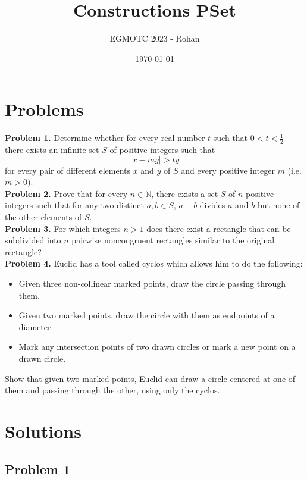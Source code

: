 \documentclass[12pt]{article}
\title{Constructions PSet}
\author{EGMOTC 2023 - Rohan}
\date{\today}
\begin{document}
\maketitle

\newcommand{\localtextbulletone}{\textcolor{black}{\raisebox{.45ex}{\rule{.6ex}{.6ex}}}}
\renewcommand{\labelitemi}{\localtextbulletone}

\section*{Problems}
\vspace{1cm}
\thispagestyle{empty}

\textbf{Problem 1.}
    Determine whether for every real number $t$ such that $0 < t < \tfrac{1}{2} $ there exists an infinite set $S$ of positive integers such that\[|x-my| > ty\]for every pair of different elements $x$ and $y$ of $S$ and every positive integer $m$ (i.e. $m > 0$).\\


\textbf{Problem 2.} Prove that for every $n\in \mathbb N$, there exists a set $S$ of $n$ positive integers such that for any two distinct $a,b\in S$, $a-b$ divides $a$ and $b$ but none of the other elements of $S$.\\

\textbf{Problem 3.} For which integers $n>1$ does there exist a rectangle that can be subdivided into $n$ pairwise noncongruent rectangles similar to the original rectangle?\\

\textbf{Problem 4.} Euclid has a tool called cyclos which allows him to do the following:
\begin{itemize}
    \item Given three non-collinear marked points, draw the circle passing through them.
    \item Given two marked points, draw the circle with them as endpoints of a diameter.
    \item Mark any intersection points of two drawn circles or mark a new point on a drawn circle.
\end{itemize}
Show that given two marked points, Euclid can draw a circle centered at one of them and passing through the other, using only the cyclos.
\eject
\section*{Solutions}
\subsection*{Problem 1}
\end{document}
